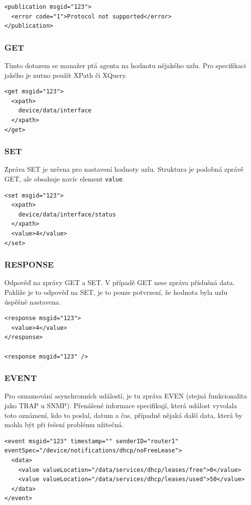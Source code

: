 \begin{verbatim}
<publication msgid="123">
  <error code="1">Protocol not supported</error>
</publication>
\end{verbatim}

\subsubsection*{GET}
Tímto dotazem se manažer ptá agenta na hodnotu nějakého uzlu. Pro specifikaci jakého je nutno použít XPath či XQuery.

\begin{verbatim}
<get msgid="123">
  <xpath>
    device/data/interface
  </xpath>
</get>
\end{verbatim}


\subsubsection*{SET}
Zpráva SET je určena pro nastavení hodnoty uzlu. Struktura je podobná zprávě GET, ale obsahuje navíc element \verb|value|.

\begin{verbatim}
<set msgid="123">
  <xpath>
    device/data/interface/status
  </xpath>
  <value>4</value>
</set>
\end{verbatim}

\subsubsection*{RESPONSE}
Odpověď na zprávy GET a SET. V případě GET nese zpráva příslušná data. Pakliže je to odpověď na SET, je to pouze potvrzení, že hodnota byla uzlu úspěšně nastavena.

\begin{verbatim}
<response msgid="123">
  <value>4</value>
</response>

<response msgid="123" />
\end{verbatim}

\subsubsection*{EVENT}
Pro oznamování asynchronních událostí, je tu zpráva EVEN (stejná funkcionalita jako TRAP u SNMP). Přenášené informace specifikují, která událost vyvolala toto oznámení,
kdo to poslal, datum a čas, případně nějaká další data, která by mohla být při řešení problému užitečná.

\begin{verbatim}
<event msgid="123" timestamp="" senderID="router1" eventSpec="/device/notifications/dhcp/noFreeLease">
  <data>
    <value valueLocation="/data/services/dhcp/leases/free">0</value>
    <value valueLocation="/data/services/dhcp/leases/used">50</value>
  </data>
</event>
\end{verbatim}

